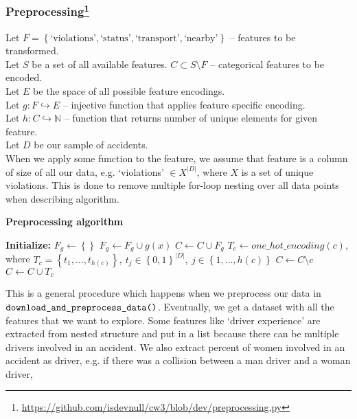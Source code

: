 \subsubsection[Preprocessing]{Preprocessing\footnote{\href{https://github.com/isdevnull/cw3/blob/dev/preprocessing.py}
{https://github.com/isdevnull/cw3/blob/dev/preprocessing.py}}}
Let $F = \left\{ \text{`violations'}, \text{`status'}, \text{`transport'}, \text{`nearby'} \right\} $ 
	– features to be transformed. \\
Let $S$ be a set of all available features. $C \subset S \setminus F$ – categorical features to be encoded. \\
Let $E$ be the space of all possible feature encodings. \\
Let $g \colon F \hookrightarrow E$ – injective function that applies feature specific encoding. \\
Let $h \colon C \hookrightarrow \mathbb{N} $ – function that returns number of unique elements for given feature. \\
Let $D$ be our sample of accidents. \\
When we apply some function to the feature, we assume that feature is a column of size of all our data, e.g.
`violations' $\in X^{|D|}$, where $X$ is a set of unique violations.
This is done to remove multiple for-loop nesting over all data points when describing algorithm.
\begin{algorithm}[H]
	\caption*{\textbf{Preprocessing algorithm}}
\begin{algorithmic}[1]
	\State \textbf{Initialize:} $F_g \gets \left\{  \right\} $ 
	\State $F_g \gets F_g \cup g(x)$
	\EndFor
	\State $C \gets C \cup F_g$ 
	\State $T_c \gets one\_hot\_encoding(c)$, where $T_c = \left\{ t_1, \ldots, t_{h(c)} \right\},
	 \ t_j \in \left\{ 0, 1 \right\}^{|D|},\ j \in \left\{ 1, \ldots, h(c) \right\} $
	\State $C \gets C \setminus c$
	\State $C \gets C \cup T_c$
	\EndFor
\end{algorithmic}	
\end{algorithm}
\noindent
This is a general procedure which happens when we preprocess our data in $\verb|download_and_preprocess_data()|$.
Eventually, we get a dataset with all the features that we want to explore.
Some features like `driver experience' are extracted from nested structure and put in a list
because there can be multiple drivers involved in an accident.
We also extract percent of women involved in an accident as driver, e.g. if there was a collision between a man driver and a woman driver,

